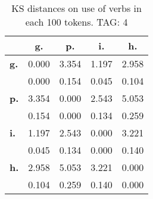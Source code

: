\begin{table}[h!]
\begin{center}
\begin{tabular}{| l || c | c | c | c |}\hline
 & {\bf g.} & {\bf p.} & {\bf i.} & {\bf h.} \\\hline\hline
{\bf g.} & 0.000 & 3.354 & 1.197 & 2.958 \\
{\bf } & 0.000 & 0.154 & 0.045 & 0.104 \\\hline
{\bf p.} & 3.354 & 0.000 & 2.543 & 5.053 \\
{\bf } & 0.154 & 0.000 & 0.134 & 0.259 \\\hline
{\bf i.} & 1.197 & 2.543 & 0.000 & 3.221 \\
{\bf } & 0.045 & 0.134 & 0.000 & 0.140 \\\hline
{\bf h.} & 2.958 & 5.053 & 3.221 & 0.000 \\
{\bf } & 0.104 & 0.259 & 0.140 & 0.000 \\\hline
\end{tabular}
\caption{KS distances on use of verbs in each 100 tokens. TAG: 4}
\end{center}
\end{table}